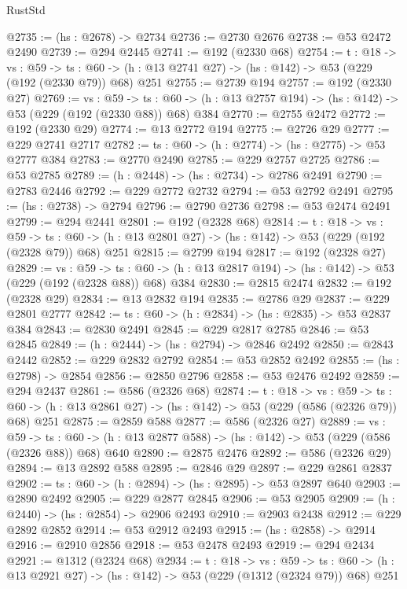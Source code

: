 \begin{lexlean}{RustStd}
\begin{coremodule}
@2735 := (hs : @2678) -> @2734
@2736 := @2730 @2676
@2738 := @53 @2472 @2490
@2739 := @294 @2445
@2741 := @192 (@2330 @68)
@2754 := {t : @18} ->
  {vs : @59} ->
  {ts : @60} -> (h : @13 @2741 @27) -> (hs : @142) -> @53 (@229 (@192 (@2330 @79)) @68) @251
@2755 := @2739 @194
@2757 := @192 (@2330 @27)
@2769 := {vs : @59} ->
  {ts : @60} -> (h : @13 @2757 @194) -> (hs : @142) -> @53 (@229 (@192 (@2330 @88)) @68) @384
@2770 := @2755 @2472
@2772 := @192 (@2330 @29)
@2774 := @13 @2772 @194
@2775 := @2726 @29
@2777 := @229 @2741 @2717
@2782 := {ts : @60} -> (h : @2774) -> (hs : @2775) -> @53 @2777 @384
@2783 := @2770 @2490
@2785 := @229 @2757 @2725
@2786 := @53 @2785
@2789 := (h : @2448) -> (hs : @2734) -> @2786 @2491
@2790 := @2783 @2446
@2792 := @229 @2772 @2732
@2794 := @53 @2792 @2491
@2795 := (hs : @2738) -> @2794
@2796 := @2790 @2736
@2798 := @53 @2474 @2491
@2799 := @294 @2441
@2801 := @192 (@2328 @68)
@2814 := {t : @18} ->
  {vs : @59} ->
  {ts : @60} -> (h : @13 @2801 @27) -> (hs : @142) -> @53 (@229 (@192 (@2328 @79)) @68) @251
@2815 := @2799 @194
@2817 := @192 (@2328 @27)
@2829 := {vs : @59} ->
  {ts : @60} -> (h : @13 @2817 @194) -> (hs : @142) -> @53 (@229 (@192 (@2328 @88)) @68) @384
@2830 := @2815 @2474
@2832 := @192 (@2328 @29)
@2834 := @13 @2832 @194
@2835 := @2786 @29
@2837 := @229 @2801 @2777
@2842 := {ts : @60} -> (h : @2834) -> (hs : @2835) -> @53 @2837 @384
@2843 := @2830 @2491
@2845 := @229 @2817 @2785
@2846 := @53 @2845
@2849 := (h : @2444) -> (hs : @2794) -> @2846 @2492
@2850 := @2843 @2442
@2852 := @229 @2832 @2792
@2854 := @53 @2852 @2492
@2855 := (hs : @2798) -> @2854
@2856 := @2850 @2796
@2858 := @53 @2476 @2492
@2859 := @294 @2437
@2861 := @586 (@2326 @68)
@2874 := {t : @18} ->
  {vs : @59} ->
  {ts : @60} -> (h : @13 @2861 @27) -> (hs : @142) -> @53 (@229 (@586 (@2326 @79)) @68) @251
@2875 := @2859 @588
@2877 := @586 (@2326 @27)
@2889 := {vs : @59} ->
  {ts : @60} -> (h : @13 @2877 @588) -> (hs : @142) -> @53 (@229 (@586 (@2326 @88)) @68) @640
@2890 := @2875 @2476
@2892 := @586 (@2326 @29)
@2894 := @13 @2892 @588
@2895 := @2846 @29
@2897 := @229 @2861 @2837
@2902 := {ts : @60} -> (h : @2894) -> (hs : @2895) -> @53 @2897 @640
@2903 := @2890 @2492
@2905 := @229 @2877 @2845
@2906 := @53 @2905
@2909 := (h : @2440) -> (hs : @2854) -> @2906 @2493
@2910 := @2903 @2438
@2912 := @229 @2892 @2852
@2914 := @53 @2912 @2493
@2915 := (hs : @2858) -> @2914
@2916 := @2910 @2856
@2918 := @53 @2478 @2493
@2919 := @294 @2434
@2921 := @1312 (@2324 @68)
@2934 := {t : @18} ->
  {vs : @59} ->
  {ts : @60} -> (h : @13 @2921 @27) -> (hs : @142) -> @53 (@229 (@1312 (@2324 @79)) @68) @251

\end{coremodule}
\end{lexlean}
